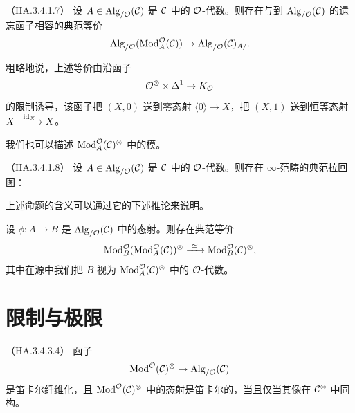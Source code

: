\begin{proposition}\label{L24-1.10}（HA.3.4.1.7）
设 $A\in\operatorname{Alg}_{/\mathcal{O}}(\mathcal{C})$ 是 $\mathcal{C}$ 中的 $\mathcal{O}$-代数。则存在与到 $\operatorname{Alg}_{/\mathcal{O}}(\mathcal{C})$ 的遗忘函子相容的典范等价
\[
\operatorname{Alg}_{/\mathcal{O}}(\operatorname{Mod}^{\mathcal{O}}_{A}(\mathcal{C}))\to\operatorname{Alg}_{/\mathcal{O}}(\mathcal{C})_{A/}.
\]
\end{proposition}

\begin{remark}\label{L24-1.11}
粗略地说，上述等价由沿函子
\[
\mathcal{O}^{\otimes}\times\Delta^{1}\to K_{\mathcal{O}}
\]
的限制诱导，该函子把 $(X,0)$ 送到零态射 $\langle 0\rangle\to X$，把 $(X,1)$ 送到恒等态射 $X\xrightarrow{\ \id_{X}\ }X$。
\end{remark}

\nitem\label{L24-1.12} 我们也可以描述 $\operatorname{Mod}^{\mathcal{O}}_{A}(\mathcal{C})^{\otimes}$ 中的模。

\begin{proposition}\label{L24-1.13}（HA.3.4.1.8）
设 $A\in\operatorname{Alg}_{/\mathcal{O}}(\mathcal{C})$ 是 $\mathcal{C}$ 中的 $\mathcal{O}$-代数。则存在 $\infty$-范畴的典范拉回图：
\begin{center}
\end{center}
\end{proposition}

\nitem\label{L24-1.14} 上述命题的含义可以通过它的下述推论来说明。

\begin{corollary}\label{L24-1.15}
设 $\phi\colon A\to B$ 是 $\operatorname{Alg}_{/\mathcal{O}}(\mathcal{C})$ 中的态射。则存在典范等价
\[
\Mod^{\OO}_{B}(\Mod^{\OO}_{A}(\cC))^{\otimes}\xrightarrow{\ \simeq\ }\Mod^{\OO}_{B}(\cC)^{\otimes},
\]
其中在源中我们把 $B$ 视为 $\operatorname{Mod}^{\mathcal{O}}_{A}(\mathcal{C})^{\otimes}$ 中的 $\mathcal{O}$-代数。
\end{corollary}

\section{限制与极限}

\begin{theorem}\label{L24-2.1}（HA.3.4.3.4）
函子
\begin{equation}\label{L24-eq2.1}
\operatorname{Mod}^{\mathcal{O}}(\mathcal{C})^{\otimes}\to\operatorname{Alg}_{/\mathcal{O}}(\mathcal{C})
\end{equation}
是笛卡尔纤维化，且 $\operatorname{Mod}^{\mathcal{O}}(\mathcal{C})^{\otimes}$ 中的态射是笛卡尔的，当且仅当其像在 $\mathcal{C}^{\otimes}$ 中同构。
\end{theorem}

